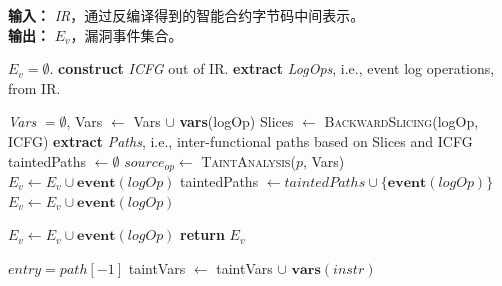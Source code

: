 \begin{algorithm}[t]
\label{algo:bytecode}
  \footnotesize
  \caption{通过后向污点分析检测不一致日志记录与事件仿冒}
  \textbf{输入：} \textit{IR}，通过反编译得到的智能合约字节码中间表示。 \\
  \textbf{输出：} $E_v$，漏洞事件集合。 
  \begin{algorithmic}[1]
    \State  $E_v = \emptyset$. 
    \State \textbf{construct} \textit{ICFG} out of IR.
    \State \textbf{extract} \textit{LogOps}, i.e., event log operations, from IR.  
    
    \State  \textit{Vars} $= \emptyset$, 
      \State Vars $\gets$ Vars $\cup$ \textbf{vars}(logOp)  
      \State Slices $\gets$ \textsc{BackwardSlicing}(logOp, ICFG) 
          \State \textbf{extract} \textit{Paths}, i.e., inter-functional paths based on Slices and ICFG
      \State taintedPaths $\gets \emptyset$   
        \State $source_{op} \gets$ \textsc{TaintAnalysis}($p$, Vars) 
                \State $E_v \gets E_v \cup \textbf{event}(logOp)$ 
            \EndIf
            \State taintedPaths $\gets taintedPaths \cup \{\textbf{event}(logOp)\} $   
        \Else
                 \State $E_v \gets E_v \cup \textbf{event}(logOp)$ 
            \EndIf

        \EndIf
        
      \EndFor
               \State $E_v \gets E_v \cup \textbf{event}(logOp)$ 
        \EndIf
    \EndFor
    \State \textbf{return} $E_v$

  \State $entry = path[-1]$  \label{begin:taintanalysis}
        \State taintVars $\gets$ taintVars $\cup$ $\textbf{vars}(instr)$  
    \EndIf
  \EndFor


\end{algorithmic}
\end{algorithm}
